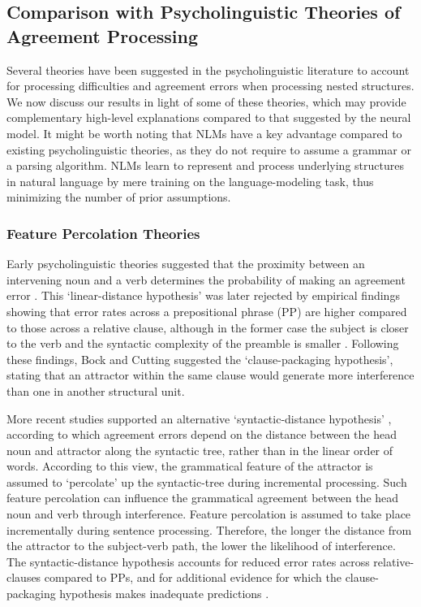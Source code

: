 \subsection{Comparison with Psycholinguistic Theories of Agreement Processing}
Several theories have been suggested in the psycholinguistic literature to account for processing difficulties and agreement errors when processing nested structures. We now discuss our results in light of some of these theories, which may provide complementary high-level explanations compared to that suggested by the neural model. It might be worth noting that NLMs have a key advantage compared to existing psycholinguistic theories, as they do not require to assume a grammar or a parsing algorithm. NLMs learn to represent and process underlying structures in natural language by mere training on the language-modeling task, thus minimizing the number of prior assumptions.


\subsubsection{Feature Percolation Theories}
Early psycholinguistic theories suggested that the proximity between an intervening noun and a verb determines the probability of making an agreement error \citep{quirk1972grammar}. This `linear-distance hypothesis' was later rejected by empirical findings showing that error rates across a prepositional phrase (PP) are higher compared to those across a relative clause, although in the former case the subject is closer to the verb and the syntactic complexity of the preamble is smaller \citep{bock1992regulating}. Following these findings, Bock and Cutting suggested the `clause-packaging hypothesis', stating that an attractor within the same clause would generate more interference than one in another structural unit. 

More recent studies supported an alternative `syntactic-distance hypothesis' \citep{vigliocco1995constructing, vigliocco1999sex, franck2002subject}, according to which agreement errors depend on the distance between the head noun and attractor along the syntactic tree, rather than in the linear order of words. According to this view, the grammatical feature of the attractor is assumed to `percolate’ up the syntactic-tree during incremental processing. Such feature percolation can influence the grammatical agreement between the head noun and verb through interference. Feature percolation is assumed to take place incrementally during sentence processing. Therefore, the longer the distance from the attractor to the subject-verb path, the lower the likelihood of interference. The syntactic-distance hypothesis accounts for reduced error rates across relative-clauses compared to PPs, and for additional evidence for which the clause-packaging hypothesis makes inadequate predictions \citep{franck2002subject}.

